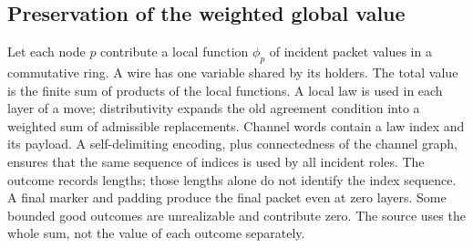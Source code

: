 \documentclass[11pt,letterpaper]{article}
\theoremstyle{definition}\newtheorem{definition}[theorem]{Definition}\newtheorem{example}[theorem]{Example}
\theoremstyle{remark}\newtheorem{remark}[theorem]{Remark}
\begin{document}
\subsection{Preservation of the weighted global value}\label{sec:glue}
Let each node $p$ contribute a local function $\phi_p$ of incident packet values in a commutative ring. A wire has one variable shared by its holders. The total value is the finite sum of products of the local functions. A local law is used in each layer of a move; distributivity expands the old agreement condition into a weighted sum of admissible replacements. Channel words contain a law index and its payload. A self-delimiting encoding, plus connectedness of the channel graph, ensures that the same sequence of indices is used by all incident roles. The outcome records lengths; those lengths alone do not identify the index sequence. A final marker and padding produce the final packet even at zero layers. Some bounded good outcomes are unrealizable and contribute zero. The source uses the whole sum, not the value of each outcome separately.
\end{document}
